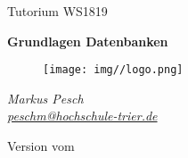 \begin{titlepage}
  \begin{center}
    \begin{large}
      Tutorium WS1819
    \end{large}

    \begin{huge}
      \begin{singlespace}
        \textbf{Grundlagen Datenbanken}
      \end{singlespace}
    \end{huge}

    \vspace{0.5cm}

    \begin{figure}[h]
      \centering
      \texttt{[image: img//logo.png]}
      \label{img:fh-trier-logo}
    \end{figure}

    \vspace{2cm}
    \begin{large}
      \textit{Markus Pesch} \\
      \href{mailto:peschm@hochschule-trier.de}{\textit{peschm@hochschule-trier.de}}
    \end{large}
    \vspace{2cm}

    Version  vom 

  \end{center}
\end{titlepage}
